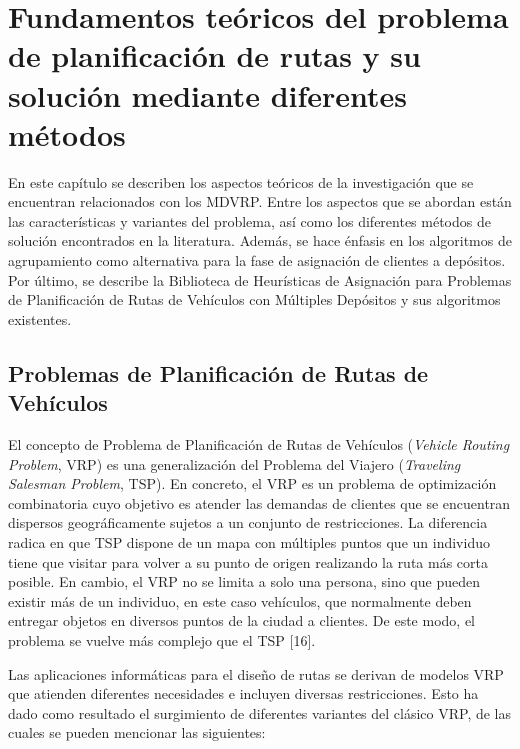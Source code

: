 \chapter{Fundamentos te\'oricos del problema de planificaci\'on de rutas y su soluci\'on mediante diferentes m\'etodos}

En este cap\'itulo se describen los aspectos te\'oricos de la investigaci\'on que se encuentran relacionados con los MDVRP. Entre los aspectos que se abordan est\'an las caracter\'isticas y variantes del problema, as\'i como los diferentes m\'etodos de soluci\'on encontrados en la literatura. Adem\'as, se hace \'enfasis en los algoritmos de agrupamiento como alternativa para la fase de asignaci\'on de clientes a dep\'ositos. Por \'ultimo, se describe la Biblioteca de Heur\'isticas de Asignaci\'on para Problemas de Planificaci\'on de Rutas de Veh\'iculos con M\'ultiples Dep\'ositos y sus algoritmos existentes.

\section{Problemas de Planificaci\'on de Rutas de Veh\'iculos}

El concepto de Problema de Planificaci\'on de Rutas de Veh\'iculos (\textit{Vehicle Routing Problem}, VRP) es una generalizaci\'on del Problema del Viajero (\textit{Traveling Salesman Problem}, TSP). En concreto, el VRP es un problema de optimizaci\'on combinatoria cuyo objetivo es atender las demandas de clientes que se encuentran dispersos geogr\'aficamente sujetos a un conjunto de restricciones. La diferencia radica en que TSP dispone de un mapa con m\'ultiples puntos que un individuo tiene que visitar para volver a su punto de origen realizando la ruta m\'as corta posible. En cambio, el VRP no se limita a solo una persona, sino que pueden existir m\'as de un individuo, en este caso veh\'iculos, que normalmente deben entregar objetos en diversos puntos de la ciudad a clientes. De este modo, el problema se vuelve m\'as complejo que el TSP [16].

Las aplicaciones inform\'aticas para el dise\~no de rutas se derivan de modelos VRP que atienden diferentes necesidades e incluyen diversas restricciones. Esto ha dado como resultado el surgimiento de diferentes variantes del cl\'asico VRP, de las cuales se pueden mencionar las siguientes:

